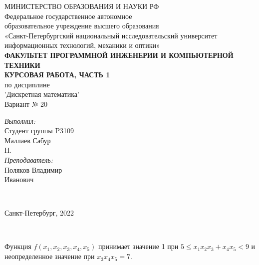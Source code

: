 \documentclass{article}
\begin{document}
{\centering
МИНИСТЕРСТВО ОБРАЗОВАНИЯ И НАУКИ РФ \\
\vspace{0.6cm}
Федеральное государственное автономное \\
образовательное учреждение высшего образования \\
«Санкт-Петербургский национальный исследовательский университет \\
 информационных технологий, механики и оптики» \\
\vspace{0.6cm}
\footnotesize{\textbf{ФАКУЛЬТЕТ ПРОГРАММНОЙ ИНЖЕНЕРИИ И КОМПЬЮТЕРНОЙ ТЕХНИКИ}} \\
\vspace{3.2cm}
\Large{\textbf{КУРСОВАЯ РАБОТА, ЧАСТЬ 1}} \\
\large{по дисциплине} \\
\Large{'Дискретная математика'} \\
\vspace{1cm}
\Large{Вариант № 20} \\
\vspace{9cm}
\begin{minipage}{\linewidth}
\raggedleft
\normalsize
\textsl{Выполнил:} \\
Студент группы P3109 \\
Маллаев Сабур \\ Н. \\
\textsl{Преподаватель:} \\
Поляков Владимир \\ Иванович
\end{minipage} \\
\vspace{2cm}
\begin{minipage}{\linewidth}
\centering
\normalsize{Санкт-Петербург, 2022} \\
\end{minipage} \\}

\thispagestyle{empty}
\newpage

Функция $f(x_1, x_2, x_3, x_4, x_5)$ принимает значение 1 при $5 \le x_1 x_2 x_3 + x_4 x_5 < 9$ и неопределенное значение при $x_3 x_4 x_5 = 7$.
\end{document}
